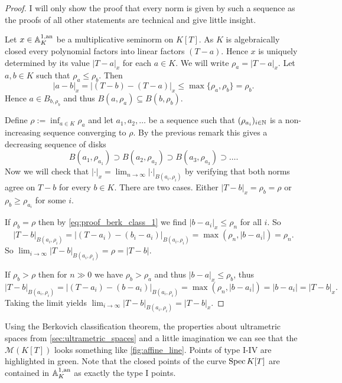 \begin{proof}
	I will only show the proof that every norm is given by such a sequence as the proofs of all other statements are technical and give little insight. 

	Let $x \in \mathbb{A}_K^{1, \text{an}}$ be a multiplicative seminorm on $K[T]$. 
	As  $K$ is algebraically closed every polynomial factors into linear factors $(T-a)$. 
	Hence $x$ is uniquely determined by its value $|T-a|_x$ for each $a \in K$. 
	We will write $\rho_a = |T-a|_x$.
	Let  $a, b \in K$ such that $\rho_a \le \rho_b$. 
	Then  \begin{equation}\label{eq:proof_berk_class_1}
		|a - b|_x = |(T-b) - (T - a)|_x \le \max \{\rho_a, \rho_b\} = \rho_b 
	.\end{equation} 
	Hence $a \in B_{b, \rho_b}$ and thus  $B(a, \rho_a) \subseteq B(b, \rho_b)$. 

	Define $\rho := \inf_{a \in K} \rho_a$ and let $a_1, a_2, \ldots$ be a sequence such that $(\rho_{a_i})_{i \in \mathbb{N}}  $ is a non-increasing sequence converging to $\rho$. 
	By the previous remark this gives a decreasing sequence of disks \[
		B(a_1, \rho_{a_1}) \supset B(a_2, \rho_{a_2}) \supset B(a_3, \rho_{a_3}) \supset\ldots
	.\] 
	Now we will check that $|\cdot |_x = \lim_{n \to \infty} |\cdot |_{B(a_i, \rho_i)}$ by verifying that both norms agree on $T- b$ for every $b \in K$. 
	 There are two cases. Either $|T - b|_x = \rho_b = \rho$ or $\rho_b \ge \rho_{a_i}$ for some $i$. 

	 If $ \rho_b = \rho$ then by \eqref{eq:proof_berk_class_1} we find $|b - a_i|_x \le \rho_n$ for all $i$.
	 So \[
		 |T - b|_{B(a_i, \rho_i)} = |(T - a_i) - (b_i - a_i)|_{B(a_i, \rho_i)} = \max(\rho_n, |b - a_i|) = \rho_n
	 .\]
	 So $\lim_{i \to \infty} |T- b|_{B(a_i, \rho_i)} = \rho = |T - b|$. 

	 If $\rho_b > \rho$ then for $n \gg 0$ we have $\rho_b > \rho_a$ and thus $|b - a|_x \le \rho_b$, thus \[
		 |T - b|_{B(a_i, \rho_i)} = |(T - a_i) - (b -a_i)|_{B(a_i, \rho_i)} = \max (\rho_n, |b - a_i|) = |b - a_i| = |T - b|_x
	 .\]   
	 Taking the limit yields $\lim_{i \to \infty} |T- b| _{B(a_i, \rho_{i})} = |T - b|_x$.
\end{proof}

Using the Berkovich classification theorem, the properties about ultrametric spaces from \cref{sec:ultrametric_spaces} and a little imagination we can see that the $\mathcal{M} (K[T])$ looks something like \cref{fig:affine_line}. 
Points of type I-IV are highlighted in green. Note that the closed points of the curve $\operatorname{Spec} K[T]$ are contained in  $\mathbb{A}_K^{1,\text{an}}$ as exactly the type I points. 

